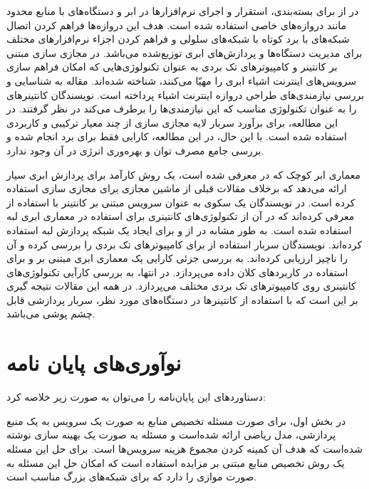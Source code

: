    در \cite{novo2015capillary} از  برای بسته‌بندی، استقرار و اجرای نرم‌افزار‌ها در ابر و دستگاه‌های با منابع محدود مانند دروازه‌های خاصی استفاده شده است.
    هدف این دروازه‌ها فراهم کردن اتصال شبکه‌های با برد کوتاه با شبکه‌های سلولی و فراهم کردن اجزاء نرم‌افزار‌های مختلف برای مدیریت دستگاه‌ها و پردازش‌های ابری توزیع‌شده می‌باشد.
    در \cite{celesti2016exploring} مجازی سازی مبتنی بر کانتینر و کامپیوتر‌های تک بردی به عنوان تکنولوژی‌هایی که امکان فراهم سازی سرویس‌های اینترنت اشیاء ابری را مهیّا می‌کنند، شناخته شده‌اند.
    مقاله \cite{krylovskiy2015internet} به شناسایی و بررسی نیازمندی‌های طراحی دروازه اینترنت اشیاء پرداخته است.
    نویسندگان کانتینر‌های  را به عنوان تکنولوژی مناسب که این نیازمندی‌ها را برطرف می‌کند در نظر گرفتند.
    در این مطالعه، برای برآورد سربار لایه مجازی سازی از چند معیار ترکیبی و کاربردی استفاده شده است.
    با این حال، در این مطالعه، کارایی فقط برای برد  انجام شده و بررسی جامع مصرف توان و بهره‌وری انرژی در آن وجود ندارد.

    معماری ابر کوچک که در \cite{satyanarayanan2009case} معرفی شده است، یک روش کارآمد برای پردازش ابری سیار ارائه می‌دهد که برخلاف مقالات قبلی از ماشین مجازی برای مجازی سازی استفاده کرده است.
    در \cite{pahl2016container} نویسندگان یک سکوی به عنوان سرویس مبتنی بر کانتینر با استفاده از  معرفی کرده‌اند که در آن از تکنولوژی‌های کانتینری برای استفاده در معماری ابری لبه استفاده شده است.
    به طور مشابه در \cite{bellavista2017feasibility} از  و  برای ایجاد یک شبکه پردازش لبه استفاده کرده‌اند.
    نویسندگان سربار استفاده از  برای کامپیوتر‌های تک بردی را بررسی کرده و آن را ناچیز ارزیابی کرده‌اند.
    \cite{hajji2016understanding} به بررسی جزئی کارایی یک معماری ابری مبتنی بر  و  برای استفاده در کاربرد‌های کلان داده می‌پردازد.
    در انتها، \cite{morabito2017virtualization} به بررسی کارآیی تکنولوژی‌های کانتینری روی کامپیوتر‌های تک بردی مختلف می‌پردازد.
    در همه این مقالات نتیجه گیری بر این است که با استفاده از کانتینر‌ها در دستگاه‌های مورد نظر، سربار پردازشی قابل چشم پوشی می‌باشد.

  \section{نو‌آوری‌های پایان نامه}
    دستاورد‌های این پایان‌نامه را می‌توان به صورت زیر خلاصه کرد:

    در بخش اول، برای صورت مسئله تخصیص منابع به صورت یک سرویس به یک منبع پردازشی، مدل ریاضی ارائه شده‌است و مسئله به صورت یک بهینه سازی نوشته شده‌است که هدف آن کمینه کردن مجموع هزینه سرویس‌ها است. برای حل این مسئله یک روش تخصیص منابع مبتنی بر مزایده استفاده است که امکان حل این مسئله به صورت موازی را دارد که برای شبکه‌های بزرگ مناسب است.


